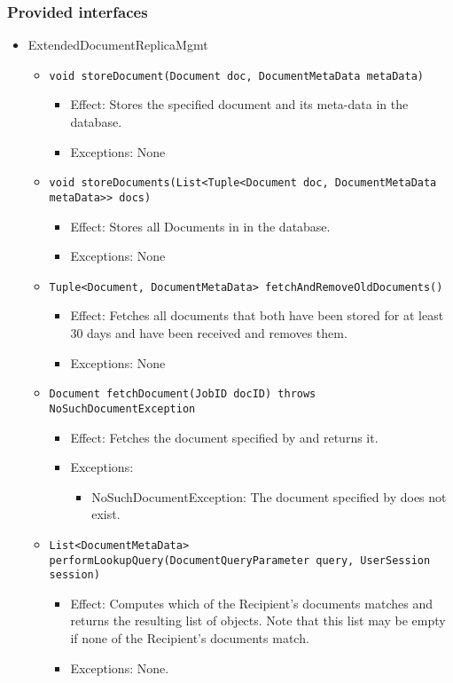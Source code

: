 \subsubsection*{Provided interfaces}
\begin{itemize}
    \item ExtendedDocumentReplicaMgmt
	\begin{itemize}
		\item \texttt{void storeDocument(Document doc, DocumentMetaData metaData)}
		\begin{itemize}
			\item Effect: Stores the specified document and its meta-data in the database.
			\item Exceptions: None
		\end{itemize}

		\item \texttt{void storeDocuments(List<Tuple<Document doc, DocumentMetaData metaData>> docs)}
		\begin{itemize}
			\item Effect: Stores all Documents in  in the database.
			\item Exceptions: None
		\end{itemize}

		\item \texttt{Tuple<Document, DocumentMetaData> fetchAndRemoveOldDocuments()}
		\begin{itemize}
			\item Effect: Fetches all documents that both have been stored for at least 30 days and have been received and removes them.
			\item Exceptions: None
		\end{itemize}

		\item \texttt{Document fetchDocument(JobID docID) throws NoSuchDocumentException}
		\begin{itemize}
			\item Effect: Fetches the document specified by  and returns it.
			\item Exceptions:
			\begin{itemize}
				\item NoSuchDocumentException: The document specified by  does not exist.
			\end{itemize}
		\end{itemize}
				
		\item \texttt{List<DocumentMetaData> performLookupQuery(DocumentQueryParameter query, UserSession session)}
		\begin{itemize}
			\item Effect: Computes which of the Recipient's documents matches  and returns the resulting list of  objects. Note that this list may be empty if none of the Recipient's documents match.
			\item Exceptions: None.
		\end{itemize}


\end{itemize}
\end{itemize}
